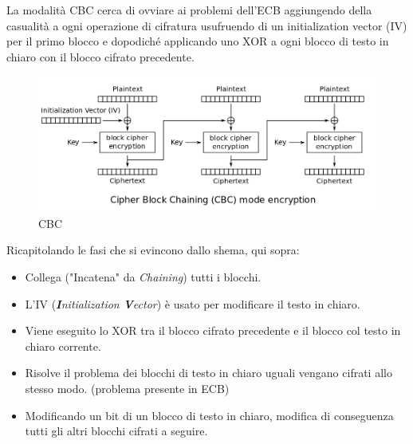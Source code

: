    

\textsf{\small La modalità CBC cerca di ovviare ai problemi dell'ECB aggiungendo della casualità a ogni operazione di cifratura usufruendo di un initialization vector (IV) per il primo blocco e dopodiché applicando uno XOR a ogni blocco di testo in chiaro con il blocco cifrato precedente.} %

\begin{figure}[H]
	\centering
	\includegraphics[width=1\textwidth, height=1\textheight, keepaspectratio]{./images/aes_modes/cbc.png} %
	\caption{CBC}
	\label{fig:cbc}
\end{figure}

\textsf{\small Ricapitolando le fasi che si evincono dallo shema, qui sopra:}

  

\begin{itemize}
	\item \textsf{\small Collega ("Incatena" da \emph{Chaining}) tutti i blocchi.}
	\item \textsf{\small L'IV (\emph{\textbf{I}nitialization \textbf{V}ector}) è usato per modificare il testo in chiaro.}
	\item \textsf{\small Viene eseguito lo XOR tra il blocco cifrato precedente e il blocco col testo in chiaro corrente.}
	\item \textsf{\small Risolve il problema dei blocchi di testo in chiaro uguali vengano cifrati allo stesso modo. (problema presente in ECB)}
	\item \textsf{\small Modificando un bit di un blocco di testo in chiaro, modifica di conseguenza tutti gli altri blocchi cifrati a seguire.}
\end{itemize}




